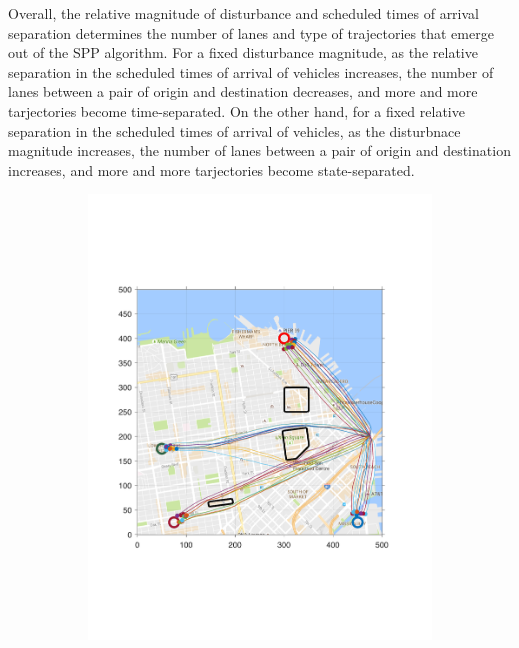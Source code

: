 Overall, the relative magnitude of disturbance and scheduled times of arrival separation determines the number of lanes and type of trajectories that emerge out of the SPP algorithm. For a fixed disturbance magnitude, as the relative separation in the scheduled times of arrival of vehicles increases, the number of lanes between a pair of origin and destination decreases, and more and more tarjectories become time-separated. On the other hand, for a fixed relative separation in the scheduled times of arrival of vehicles, as the disturbnace magnitude increases, the number of lanes between a pair of origin and destination increases, and more and more tarjectories become state-separated.
%
\begin{figure}[!htb]
 \centering
\begin{subfigure}{\columnwidth}
  \includegraphics[width=\columnwidth]{figs/sf_d6sep0}
  \label{fig:sf_d6sep0}
\end{subfigure}%
\begin{subfigure}{\columnwidth}

\end{subfigure}
\end{figure}
